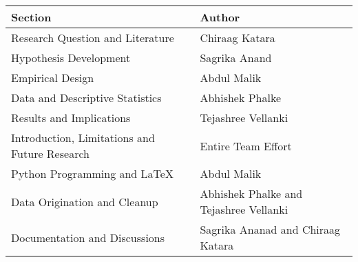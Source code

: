 \begin{table}[h]
    \centering
    \renewcommand{\arraystretch}{1.3}  %
    \begin{tabular}{|m{}|m{}|}
        \hline
        \textbf{Section} & \textbf{Author} \\
        \hline
        Research Question and Literature & Chiraag Katara \\
        \hline
        Hypothesis Development & Sagrika Anand \\
        \hline
        Empirical Design & Abdul Malik \\
        \hline
        Data and Descriptive Statistics & Abhishek Phalke \\
        \hline
        Results and Implications & Tejashree Vellanki \\
        \hline
        Introduction, Limitations and Future Research & Entire Team Effort \\
        \hline
        Python Programming and LaTeX & Abdul Malik \\
        \hline
        Data Origination and Cleanup & Abhishek Phalke and Tejashree Vellanki \\
        \hline
        Documentation and Discussions & Sagrika Ananad and Chiraag Katara \\
        \hline
    \end{tabular}
\end{table}
 
